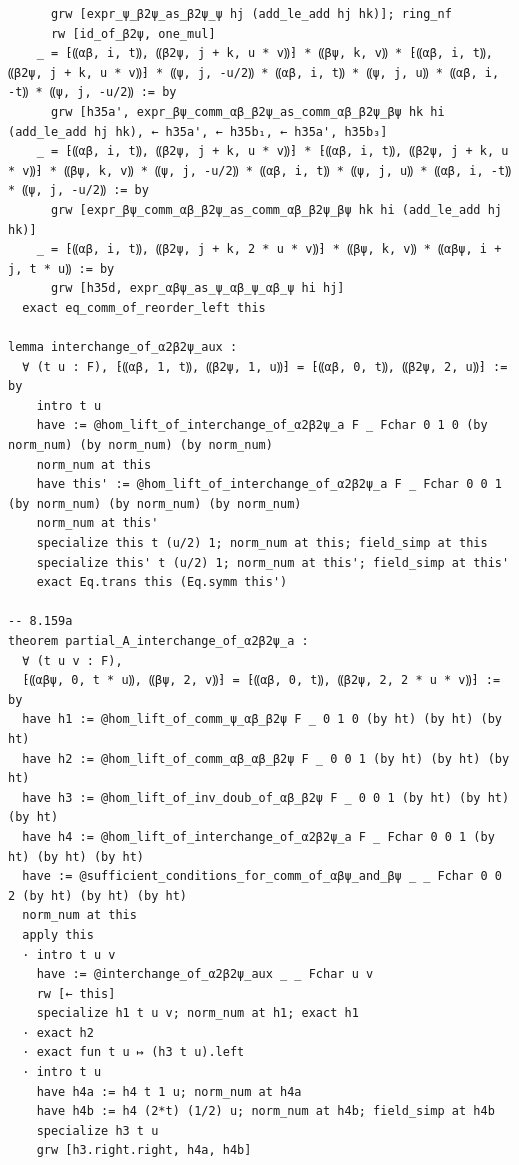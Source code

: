 \begin{Verbatim}
      grw [expr_ψ_β2ψ_as_β2ψ_ψ hj (add_le_add hj hk)]; ring_nf
      rw [id_of_β2ψ, one_mul]
    _ = ⁅⸨αβ, i, t⸩, ⸨β2ψ, j + k, u * v⸩⁆ * ⸨βψ, k, v⸩ * ⁅⸨αβ, i, t⸩, ⸨β2ψ, j + k, u * v⸩⁆ * ⸨ψ, j, -u/2⸩ * ⸨αβ, i, t⸩ * ⸨ψ, j, u⸩ * ⸨αβ, i, -t⸩ * ⸨ψ, j, -u/2⸩ := by
      grw [h35a', expr_βψ_comm_αβ_β2ψ_as_comm_αβ_β2ψ_βψ hk hi (add_le_add hj hk), ← h35a', ← h35b₁, ← h35a', h35b₃]
    _ = ⁅⸨αβ, i, t⸩, ⸨β2ψ, j + k, u * v⸩⁆ * ⁅⸨αβ, i, t⸩, ⸨β2ψ, j + k, u * v⸩⁆ * ⸨βψ, k, v⸩ * ⸨ψ, j, -u/2⸩ * ⸨αβ, i, t⸩ * ⸨ψ, j, u⸩ * ⸨αβ, i, -t⸩ * ⸨ψ, j, -u/2⸩ := by
      grw [expr_βψ_comm_αβ_β2ψ_as_comm_αβ_β2ψ_βψ hk hi (add_le_add hj hk)]
    _ = ⁅⸨αβ, i, t⸩, ⸨β2ψ, j + k, 2 * u * v⸩⁆ * ⸨βψ, k, v⸩ * ⸨αβψ, i + j, t * u⸩ := by
      grw [h35d, expr_αβψ_as_ψ_αβ_ψ_αβ_ψ hi hj]
  exact eq_comm_of_reorder_left this

lemma interchange_of_α2β2ψ_aux :
  ∀ (t u : F), ⁅⸨αβ, 1, t⸩, ⸨β2ψ, 1, u⸩⁆ = ⁅⸨αβ, 0, t⸩, ⸨β2ψ, 2, u⸩⁆ := by
    intro t u
    have := @hom_lift_of_interchange_of_α2β2ψ_a F _ Fchar 0 1 0 (by norm_num) (by norm_num) (by norm_num)
    norm_num at this
    have this' := @hom_lift_of_interchange_of_α2β2ψ_a F _ Fchar 0 0 1 (by norm_num) (by norm_num) (by norm_num)
    norm_num at this'
    specialize this t (u/2) 1; norm_num at this; field_simp at this
    specialize this' t (u/2) 1; norm_num at this'; field_simp at this'
    exact Eq.trans this (Eq.symm this')

-- 8.159a
theorem partial_A_interchange_of_α2β2ψ_a :
  ∀ (t u v : F),
  ⁅⸨αβψ, 0, t * u⸩, ⸨βψ, 2, v⸩⁆ = ⁅⸨αβ, 0, t⸩, ⸨β2ψ, 2, 2 * u * v⸩⁆ := by
  have h1 := @hom_lift_of_comm_ψ_αβ_β2ψ F _ 0 1 0 (by ht) (by ht) (by ht)
  have h2 := @hom_lift_of_comm_αβ_αβ_β2ψ F _ 0 0 1 (by ht) (by ht) (by ht)
  have h3 := @hom_lift_of_inv_doub_of_αβ_β2ψ F _ 0 0 1 (by ht) (by ht) (by ht)
  have h4 := @hom_lift_of_interchange_of_α2β2ψ_a F _ Fchar 0 0 1 (by ht) (by ht) (by ht)
  have := @sufficient_conditions_for_comm_of_αβψ_and_βψ _ _ Fchar 0 0 2 (by ht) (by ht) (by ht)
  norm_num at this
  apply this
  · intro t u v
    have := @interchange_of_α2β2ψ_aux _ _ Fchar u v
    rw [← this]
    specialize h1 t u v; norm_num at h1; exact h1
  · exact h2
  · exact fun t u ↦ (h3 t u).left
  · intro t u
    have h4a := h4 t 1 u; norm_num at h4a
    have h4b := h4 (2*t) (1/2) u; norm_num at h4b; field_simp at h4b
    specialize h3 t u
    grw [h3.right.right, h4a, h4b]


\end{Verbatim}
